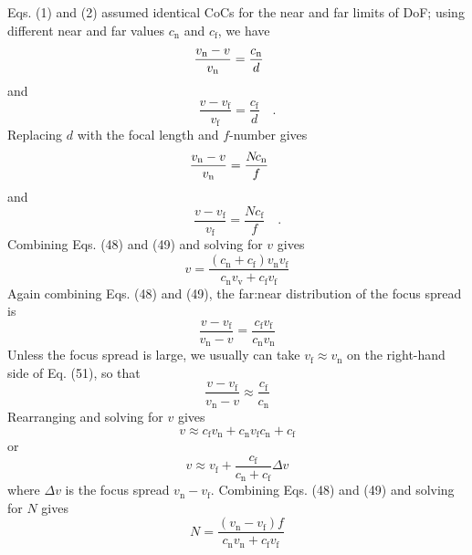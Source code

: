 \documentclass[11pt, oneside]{scrartcl}   	%
\newcommand{\Dv}{\ensuremath{\Delta v}}
\begin{document}
Eqs. (1) and (2) assumed identical CoCs for the near and far limits of DoF; using different near and far values $c_\mathrm{n}$ and $c_\mathrm{f}$, we have
\begin{equation}
   \frac{v_\mathrm{n} - v}{v_\mathrm{n}} = \frac{c_\mathrm{n}}d\hphantom{\quad.}
   \label{eq:46}
\end{equation}
and
\begin{equation}
   \frac{v - v_\mathrm{f}}{v_\mathrm{f}} = \frac{c_\mathrm{f}}d \quad .
   \label{eq:47}
\end{equation}
Replacing $d$ with the focal length and $f$-number gives
\begin{equation}
   \frac{v_\mathrm{n} - v}{v_\mathrm{n}} = \frac{N\!c_\mathrm{n}}f\hphantom{\quad.}
   \label{eq:48}
\end{equation}
and
\begin{equation}
   \frac{v - v_\mathrm{f}}{v_\mathrm{f}} = \frac{N\!c_\mathrm{f}}f \quad .
   \label{eq:49}
\end{equation}
Combining Eqs. (48) and (49) and solving for $v$ gives
\begin{equation}
v = \frac{(c_\mathrm{n} + c_\mathrm{f}) v_\mathrm{n} v_\mathrm{f}}{c_\mathrm{n}v_\mathrm{v} + c_\mathrm{f}v_\mathrm{f}}
   \label{eq:50}
\end{equation}
Again combining Eqs. (48) and (49), the far:near distribution of the focus spread is
\begin{equation}
   \frac{v - v_\mathrm{f}}{v_\mathrm{n} - v} = \frac{c_\mathrm{f}v_\mathrm{f}}{c_\mathrm{n}v_\mathrm{n}}
   \label{eq:51}
\end{equation}
Unless the focus spread is large, we usually can take $v_\mathrm{f} \approx v_\mathrm{n}$ on the right-hand side of
 Eq. (51), so that
\begin{equation}
   \frac{v - v_\mathrm{f}}{v_\mathrm{n} - v} \approx \frac{c_\mathrm{f}}{c_\mathrm{n}}
   \label{eq:52}
\end{equation}
Rearranging and solving for $v$ gives
\begin{equation}
   v\approx{c_\mathrm{f}v_\mathrm{n}+c_\mathrm{n}v_\mathrm{f}}{c_\mathrm{n}+c_\mathrm{f}}
   \label{eq:53}
\end{equation}
or
\begin{equation}
   v\approx v_\mathrm{f}+\frac{c_\mathrm{f}}{c_\mathrm{n}+c_\mathrm{f}}\Dv
   \label{eq:54}
\end{equation}
where $Δv$ is the focus spread $v_\mathrm{n} - v_\mathrm{f}$. Combining Eqs. (48) and (49) and solving for $N$ gives
\begin{equation}
   N=\frac{(v_\mathrm{n}-v_\mathrm{f})f}{c_\mathrm{n}v_\mathrm{n}+c_\mathrm{f}v_\mathrm{f}}
   \label{eq:55}
\end{equation}
\end{document}
